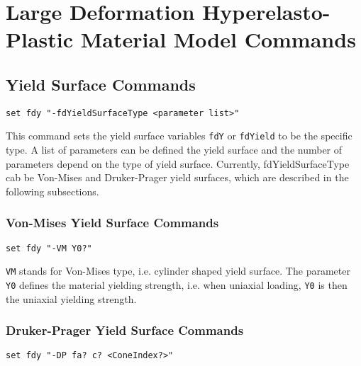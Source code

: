 \section{Large Deformation Hyperelasto-Plastic Material Model Commands }

\subsection{Yield Surface Commands}
\label{fdys}

\begin{verbatim}
set fdy "-fdYieldSurfaceType <parameter list>" 
\end{verbatim}

This command sets the yield surface variables \texttt{fdY} or \texttt{fdYield} to be the
specific type. A list of parameters can be defined the yield surface and the number of 
parameters depend on the type of yield surface. Currently, fdYieldSurfaceType cab be 
Von-Mises and Druker-Prager yield surfaces, which are described in the following subsections.


\subsubsection{Von-Mises Yield Surface Commands}
\label{fdVMys}

\begin{verbatim}
set fdy "-VM Y0?" 
\end{verbatim}

\texttt{VM} stands for Von-Mises type, i.e. cylinder shaped yield surface. The parameter \texttt{Y0} 
defines the material yielding strength, i.e. when uniaxial loading, \texttt{Y0} is then the 
uniaxial yielding strength.   
 
\subsubsection{Druker-Prager Yield Surface Commands}
\label{fdDPys}

\begin{verbatim}
set fdy "-DP fa? c? <ConeIndex?>" 
\end{verbatim}

